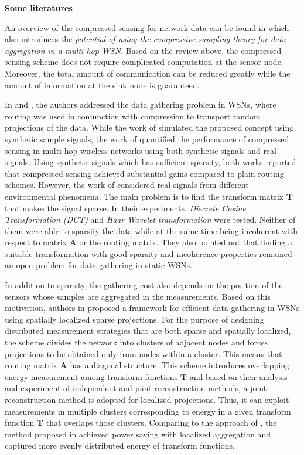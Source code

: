 \textbf{Some literatures}

An overview of the compressed sensing for network data can be found in \cite{Haupt2008} which also introduces the \emph{\textcolor[rgb]{1,0,0}{potential of using the compressive sampling theory for data aggregation in a multi-hop WSN}}. Based on the review above, the compressed sensing scheme does not require complicated computation at the sensor node. Moreover, the total amount of communication can be reduced greatly while the amount of information at the sink node is guaranteed. 

In \cite{5044947} and \cite{Luo2009}, the authors addressed the data gathering problem in WSNs, where \textcolor[rgb]{1,0,0}{routing was used in conjunction with compression to transport random projections of the data}. While the work of \cite{Luo2009} simulated the proposed concept using synthetic sample signals, the work of \cite{5044947} quantified the performance of compressed sensing in multi-hop wireless networks using both synthetic signals and real signals. Using synthetic signals which has sufficient sparsity, both works reported that compressed sensing achieved substantial gains compared to plain routing schemes. However, the work of \cite{5044947} considered real signals from different environmental phenomena. The main problem is to find \textcolor[rgb]{1,0,0}{the transform matrix $\mathbf{T}$ that makes the signal sparse}. In their experiments, \emph{\textcolor[rgb]{1,0,0}{Discrete Cosine Transformation (DCT)}} and \emph{\textcolor[rgb]{1,0,0}{Haar Wavelet transformation}} were tested. Neither of them were able to sparsify the data while \textcolor[rgb]{1,0,0}{at the same time being incoherent with respect to matrix $\mathbf{A}$ or the routing matrix}. They also pointed out that finding a suitable transformation with good sparsity and incoherence properties remained an open problem for data gathering in static WSNs. 

In addition to sparsity, the gathering cost also depends on the position of the sensors whose samples are aggregated in the measurements. Based on this motivation, authors in \cite{Lee2009} proposed a framework for efficient data gathering in WSNs using spatially localized sparse projections. For the purpose of designing \textcolor[rgb]{1,0,0}{distributed measurement strategies that are both sparse and spatially localized}, the scheme divides the network into \textcolor[rgb]{1,0,0}{clusters of adjacent nodes and forces projections to be obtained only from nodes within a cluster}. This means that routing matrix $\mathbf{A}$ has \textcolor[rgb]{1,0,0}{a diagonal structure}. This scheme introduces overlapping energy measurement among transform functions $\mathbf{T}$ and based on their analysis and experiment of independent and joint reconstruction methods, a joint reconstruction method is adopted for localized projections. Thus, it can exploit measurements in multiple clusters corresponding to energy in a given transform function $\mathbf{T}$ that overlaps those clusters. Comparing to the approach of \cite{5044947}, the method proposed in \cite{Lee2009} achieved \textcolor[rgb]{1,0,0}{power saving with localized aggregation and captured more evenly distributed energy of transform functions}. 

